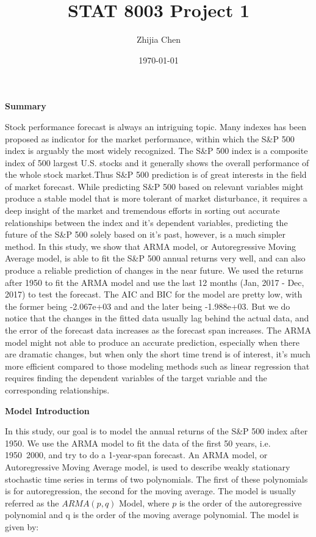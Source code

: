 \documentclass{article}
\title{STAT 8003 Project 1}
\author{Zhijia Chen}
\date{\today}
\begin{document}
\begin{titlepage}
    \maketitle
\end{titlepage}

\textbf{Summary}

Stock performance forecast is always an intriguing topic. Many indexes has been proposed as indicator for the market performance, within which the S\&P 500 index is arguably the most widely recognized. The S\&P 500 index is a composite index of 500 largest U.S. stocks and it generally shows the overall performance of the whole stock market.Thus S\&P 500 prediction is of great interests in the field of market forecast. While predicting S\&P 500 based on relevant variables might produce a stable model that is more tolerant of market disturbance, it requires a deep insight of the market and tremendous efforts in sorting out accurate relationships between the index and it's dependent variables, predicting the future of the S\&P 500 solely based on it's past, however, is a much simpler method. In this study, we show that ARMA model, or Autoregressive Moving Average model, is able to fit the S\&P 500 annual returns very well, and can also produce a reliable prediction of changes in the near future. We used the returns after 1950 to fit the ARMA model and use the last 12 months (Jan, 2017 - Dec, 2017) to test the forecast. The AIC and BIC for the model are pretty low, with the former being -2.067e+03 and and the later being -1.988e+03. But we do notice that the changes in the fitted data usually lag behind the actual data, and the error of the forecast data increases as the forecast span increases. The ARMA model might not able to produce an accurate prediction, especially when there are dramatic changes, but when only the short time trend is of interest, it's much more efficient compared to those modeling methods such as linear regression that requires finding the dependent variables of the target variable and the corresponding relationships.

\vspace{\baselineskip}
\textbf{Model Introduction}

In this study, our goal is to model the annual returns of the S\&P 500 index after 1950. We use the ARMA model to fit the data of the first 50 years, i.e. 1950~2000, and try to do a 1-year-span forecast. An ARMA model, or Autoregressive Moving Average model, is used to describe weakly stationary stochastic time series in terms of two polynomials. The first of these polynomials is for autoregression, the second for the moving average\cite{arma}. The model is usually referred as the $ARMA(p,q)$ Model, where $p$ is the order of the autoregressive polynomial and q is the order of the moving average polynomial. The model is given by:
\end{document}
